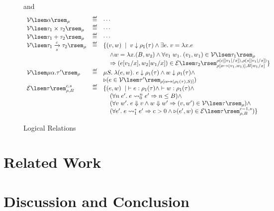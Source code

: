 \documentclass[preprint]{sigplanconf}
\newcommand{\arrow}[4]{#1\xrightarrow[#3]{#2}#4}
\newcommand{\relV}[1]{\mathcal{V}\lsem#1\rsem}
\newcommand{\relE}[1]{\mathcal{E}\lsem#1\rsem}
\newcommand{\later}{\triangleright}
\newcommand\defeq{\mathrel{\overset{\makebox[0pt]{\mbox{\normalfont\tiny\sffamily def}}}{=}}}
\begin{document}
\begin{figure}
\fbox{$\relV{\tau}$} and \fbox{$\relE{\tau}$}
$$
\begin{array}{lcl}
  \relV{\alpha}_\rho &\defeq& \cdots \\
  \relV{\tau_1\times\tau_2}_\rho &\defeq& \cdots \\
  \relV{\tau_1+\tau_2}_\rho &\defeq& \cdots \\
  \relV{\arrow{\tau_1}{c}{s}{\tau_2}}_\rho &\defeq& \{(v,w) \;\mid\; v \downarrow \rho_1(\tau) \wedge \exists e.\;v=\lambda x.e \\
  & & \hspace{.15in} \wedge w=\lambda x.(B,w_2) \wedge \forall v_1\;w_1.\;(v_1,w_1) \in \relV{\tau_1}_\rho \\
  & & \hspace{.15in} \Rightarrow (e[v_1/x], w_2[w_1/x])\in \relE{\tau_2}^{\rho(c[|v_1|/x]),\rho(s[|v_1|/x])}_{\rho[x\mapsto(v_1,w_1)],B[w_1/x]}\} \\
  \relV{\mu\alpha.\tau'}_\rho &\defeq& \mu S.\;\lambda (e,w).\; e \downarrow \rho_1(\tau) \wedge w \downarrow \rho_1(\tau) \wedge \\
  & & \later (e \in \relV{\tau'}_{\rho[\alpha\mapsto(\rho_1(\tau),S)]}) \\
  \relE{\tau}^{c,s}_{\rho,B} &\defeq& \{(e,w) \;\mid\; \vdash e:\rho_1(\tau) \wedge \vdash w:\rho_1(\tau) \wedge \\
  & & \hspace{.15in} (\forall n\;e'.\; e\leadsto^n_0 e' \Rightarrow n \leq B) \wedge \\
  & & \hspace{.15in} (\forall v\;w'.\; e\Downarrow v \wedge w\Downarrow w'\Rightarrow (v,w') \in \relV{\tau}_\rho) \wedge \\
  & & \hspace{.15in} (\forall e'.\; e\leadsto^*_1 e' \Rightarrow c > 0 \wedge \later (e',w)\in \relE{\tau}^{c-1,s}_{\rho,B}) \}
\end{array}
$$
\caption{\label{lrel}Logical Relations}
\end{figure}

\section{\label{section-related}Related Work}

\section{\label{section-discussion}Discussion and Conclusion}
\end{document}
